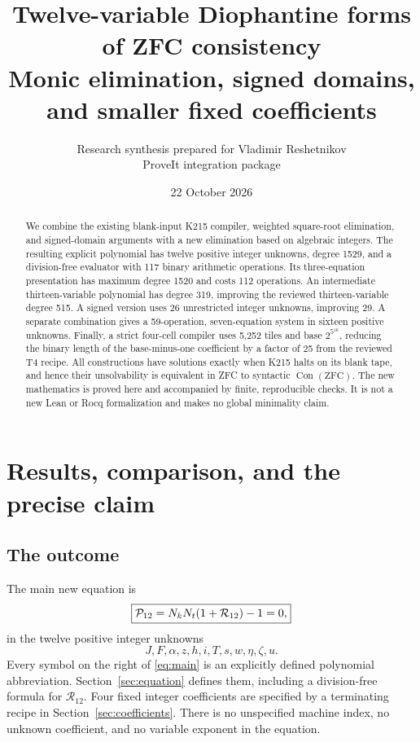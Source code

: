 \documentclass[11pt,letterpaper]{article}
\title{\textbf{Twelve-variable Diophantine forms\\of ZFC consistency}\\[0.6em]
 \large Monic elimination, signed domains, and smaller fixed coefficients}
\author{Research synthesis prepared for Vladimir Reshetnikov\\\small ProveIt integration package}
\date{22 October 2026}
\theoremstyle{remark}\newtheorem{remark}[theorem]{Remark}
\newcommand{\Con}{\operatorname{Con}}\newcommand{\Res}{\operatorname{Res}}
\begin{document}
\maketitle
\begin{abstract}
We combine the existing blank-input K215 compiler, weighted square-root elimination,
and signed-domain arguments with a new elimination based on algebraic integers.
The resulting explicit polynomial has twelve positive integer unknowns, degree
1529, and a division-free evaluator with 117 binary arithmetic operations. Its
three-equation presentation has maximum degree 1520 and costs 112 operations.
An intermediate thirteen-variable polynomial has degree 319, improving the
reviewed thirteen-variable degree 515. A signed version uses 26 unrestricted
integer unknowns, improving 29. A separate combination gives a 59-operation,
seven-equation system in sixteen positive unknowns. Finally, a strict four-cell
compiler uses 5,252 tiles and base $2^{5^{16}}$, reducing the binary length of
the base-minus-one coefficient by a factor of 25 from the reviewed T4 recipe.
All constructions have solutions exactly when K215 halts on its blank tape,
and hence their unsolvability is equivalent in ZFC to syntactic $\Con(\mathrm{ZFC})$.
The new mathematics is proved here and accompanied by finite, reproducible
checks. It is not a new Lean or Rocq formalization and makes no global minimality claim.
\end{abstract}

\section{Results, comparison, and the precise claim}

\subsection{The outcome}
The main new equation is
\begin{equation}\label{eq:main}
 \boxed{\mathcal P_{12}=N_kN_t(1+\mathcal R_{12})-1=0,}
\end{equation}
in the twelve positive integer unknowns
\begin{equation}\label{eq:variables}
 J,F,\alpha,z,h,i,T,s,w,\eta,\zeta,u.
\end{equation}
Every symbol on the right of \eqref{eq:main} is an explicitly defined polynomial
abbreviation. Section~\ref{sec:equation} defines them, including a division-free
formula for $\mathcal R_{12}$. Four fixed integer coefficients are specified by
a terminating recipe in Section~\ref{sec:coefficients}. There is no unspecified
machine index, no unknown coefficient, and no variable exponent in the equation.
\end{document}
